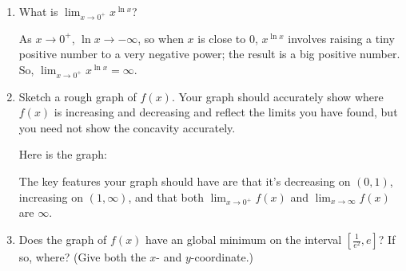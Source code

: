 \documentclass{article}
\begin{document}
\begin{enumerate}[topsep=0pt]
\begin{enumerate}
  \item
    \begin{problem}[\stretch{0.2}]
      What is $\displaystyle \lim_{x \to 0^+} x^{\ln x}$?

    \end{problem}

    \begin{solution}
      As $x \to 0^+$, $\ln x \to -\infty$, so when $x$ is close to 0,
      $x^{\ln x}$ involves raising a tiny positive number to a very
      negative power; the result is a big positive number.  So,
      $\displaystyle \lim_{x \to 0^+} x^{\ln x} = \boxed{\infty}$.
    \end{solution}

\pspace{\newpage}

  \item
    \begin{problem}[\stretch{1}]
      Sketch a rough graph of $f(x)$.  Your graph should accurately show
      where $f(x)$ is increasing and decreasing and reflect the limits you
      have found, but you need not show the concavity accurately.
    \end{problem}

    \begin{solution} %
      Here is the graph:
      \begin{center}
      \end{center}
      The key features your graph should have are that it's decreasing on
      $(0, 1)$, increasing on $(1, \infty)$, and that both $\displaystyle
      \lim_{x \to 0^+} f(x)$ and $\displaystyle \lim_{x \to \infty} f(x)$
      are $\infty$. 
    \end{solution}

  \item
    \begin{problem}[\vfill]
      Does the graph of $f(x)$ have an global minimum on the interval $\left[
        \frac{1}{e^2}, e \right]$?  If so, where?  (Give both the $x$- and
      $y$-coordinate.)
    \end{problem}


\end{enumerate}
\end{enumerate}
\end{document}
